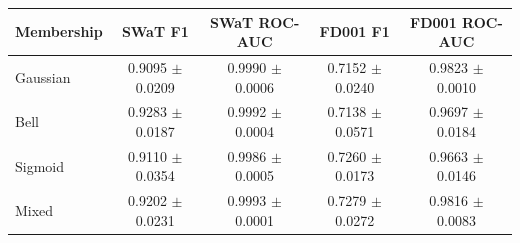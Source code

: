 \begin{tabular}{lcccc}
\toprule
Membership & SWaT F1 & SWaT ROC-AUC & FD001 F1 & FD001 ROC-AUC \\
\midrule
Gaussian & 0.9095 $\pm$ 0.0209 & 0.9990 $\pm$ 0.0006 & 0.7152 $\pm$ 0.0240 & 0.9823 $\pm$ 0.0010 \\
Bell & 0.9283 $\pm$ 0.0187 & 0.9992 $\pm$ 0.0004 & 0.7138 $\pm$ 0.0571 & 0.9697 $\pm$ 0.0184 \\
Sigmoid & 0.9110 $\pm$ 0.0354 & 0.9986 $\pm$ 0.0005 & 0.7260 $\pm$ 0.0173 & 0.9663 $\pm$ 0.0146 \\
Mixed & 0.9202 $\pm$ 0.0231 & 0.9993 $\pm$ 0.0001 & 0.7279 $\pm$ 0.0272 & 0.9816 $\pm$ 0.0083 \\
\bottomrule
\end{tabular}
